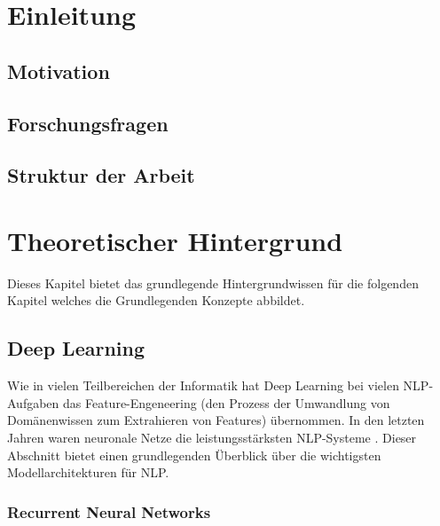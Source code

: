 \documentclass[
        ngerman,
        paper=a4,
        numbers=noendperiod,
]{scrreprt}
\begin{document}
\chapter{Einleitung}
\section{Motivation}
\section{Forschungsfragen}
\section{Struktur der Arbeit}

\chapter{Theoretischer Hintergrund}
Dieses Kapitel bietet das grundlegende Hintergrundwissen für die folgenden Kapitel welches die Grundlegenden Konzepte abbildet.

\section{Deep Learning}
Wie in vielen Teilbereichen der Informatik hat Deep Learning bei vielen NLP-Aufgaben das Feature-Engeneering (den Prozess der Umwandlung von Domänenwissen zum Extrahieren von Features) übernommen. In den letzten Jahren waren neuronale Netze die leistungsstärksten NLP-Systeme \citep{young2018recent}. Dieser Abschnitt bietet einen grundlegenden Überblick über die wichtigsten Modellarchitekturen für NLP.
\subsection{Recurrent Neural Networks}
\end{document}

